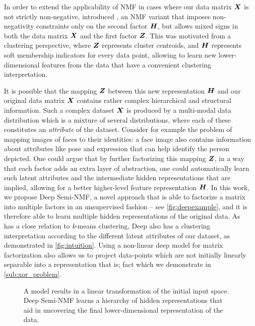 \documentclass[10pt,journal,compsoc]{IEEEtran}
\begin{document}
In order to extend the applicability of NMF in cases where our data matrix $\boldsymbol X$ is not strictly non-negative, \cite{ding2010convex} introduced \seminmf, an NMF variant that imposes non-negativity constraints only on the second factor $\boldsymbol H$, but allows mixed signs in both the data matrix $\boldsymbol X$ and the first factor $\boldsymbol Z$. This was motivated from a clustering perspective, where $\boldsymbol Z$ represents cluster centroids, and $\boldsymbol H$ represents soft membership indicators for every data point, allowing \seminmf to learn new lower-dimensional features from the data that have a convenient clustering interpretation.

It is possible that the mapping $\boldsymbol Z$ between this new representation $\boldsymbol H$ and our original data matrix $\boldsymbol X$ contains rather complex hierarchical and structural information. Such a complex dataset $\boldsymbol X$ is produced by a multi-modal data distribution which is a mixture of several distributions, where each of these constitutes an {\it attribute} of the dataset. Consider for example the problem of mapping images of faces to their identities: a face image also contains information about attributes like pose and expression that can help identify the person depicted. One could argue that by further factorizing this mapping $\boldsymbol Z$, in a way that each factor adds an extra layer of abstraction, one could automatically learn such latent attributes and the intermediate hidden representations that are implied, allowing for a better higher-level feature representation $\boldsymbol H$. In this work, we propose Deep Semi-NMF, a novel approach that is able to factorize a matrix into multiple factors in an unsupervised fashion -- see \autoref{fig:deepexample}, and it is therefore able to learn multiple hidden representations of the original data. 
As \seminmf has a close relation to \emph{k}-means clustering, Deep \seminmf also has a clustering interpretation according to the different latent attributes of our dataset, as demonstrated in \autoref{fig:intuition}. 
Using a non-linear deep model for matrix factorization also allows us to project data-points which are not initially linearly separable into a representation that is; fact which we demonstrate in \autoref{sub:xor_problem}.

\begin{figure}[tb]
\hspace{1cm}
\caption{\protect{} A \seminmf model results in a linear transformation of the initial input space. \protect{} Deep Semi-NMF learns a hierarchy of hidden representations that aid in uncovering the final lower-dimensional representation of the data.}
\label{fig:deepexample}
\end{figure}
\end{document}
